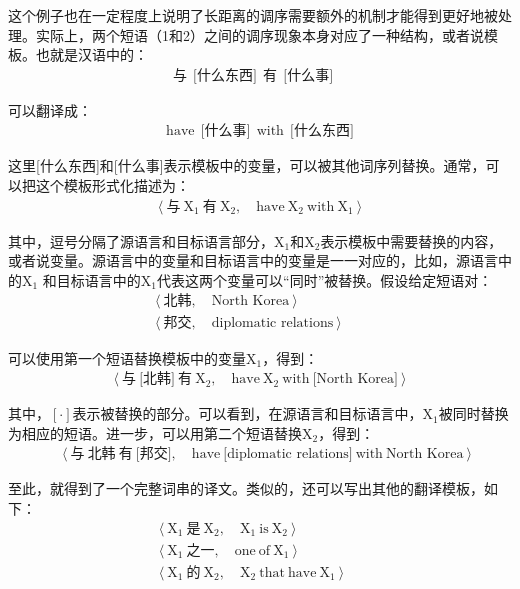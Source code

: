 \parinterval 这个例子也在一定程度上说明了长距离的调序需要额外的机制才能得到更好地被处理。实际上，两个短语（1和2）之间的调序现象本身对应了一种结构，或者说模板。也就是汉语中的：
\begin{eqnarray}
\text{与}\ \ \text{[什么东西]}\ \ \text{有}\ \ \text{[什么事]} \quad \nonumber
\end{eqnarray}

\parinterval 可以翻译成：
\begin{eqnarray}
\textrm{have}\ \ \text{[什么事]}\ \ \textrm{with}\ \ \text{[什么东西]} \nonumber
\end{eqnarray}

\parinterval 这里[什么东西]和[什么事]表示模板中的变量，可以被其他词序列替换。通常，可以把这个模板形式化描述为：
\begin{eqnarray}
\langle \ \text{与}\ \textrm{X}_1\ \text{有}\ \textrm{X}_2,\quad \textrm{have}\ \textrm{X}_2\ \textrm{with}\ \textrm{X}_1\ \rangle \nonumber
\end{eqnarray}

\noindent 其中，逗号分隔了源语言和目标语言部分，$\textrm{X}_1$和$\textrm{X}_2$表示模板中需要替换的内容，或者说变量。源语言中的变量和目标语言中的变量是一一对应的，比如，源语言中的$\textrm{X}_1$ 和目标语言中的$\textrm{X}_1$代表这两个变量可以``同时''被替换。假设给定短语对：
\begin{eqnarray}
\langle \ \text{北韩},\quad \textrm{North Korea} \ \rangle \qquad\ \quad\quad\ \  \nonumber \\
\langle \ \text{邦交},\quad \textrm{diplomatic relations} \ \rangle\quad\ \ \ \nonumber
\end{eqnarray}

\parinterval 可以使用第一个短语替换模板中的变量$\textrm{X}_1$，得到：
\begin{eqnarray}
\langle \ \text{与}\ \text{[北韩]}\ \text{有}\ \textrm{X}_2,\quad \textrm{have}\ \textrm{X}_2\ \textrm{with}\ \textrm{[North Korea]} \ \rangle \nonumber
\end{eqnarray}

\noindent 其中，$[\cdot]$表示被替换的部分。可以看到，在源语言和目标语言中，$\textrm{X}_1$被同时替换为相应的短语。进一步，可以用第二个短语替换$\textrm{X}_2$，得到：
\begin{eqnarray}
\quad\langle \ \text{与}\ \text{北韩}\ \text{有}\ \text{[邦交]},\quad \textrm{have}\ \textrm{[diplomatic relations]}\ \textrm{with}\ \textrm{North Korea} \ \rangle \nonumber
\end{eqnarray}

\parinterval 至此，就得到了一个完整词串的译文。类似的，还可以写出其他的翻译模板，如下：
\begin{eqnarray}
\langle \ \textrm{X}_1\ \text{是}\ \textrm{X}_2,\quad \textrm{X}_1\ \textrm{is}\ \textrm{X}_2 \ \rangle \qquad\qquad\ \nonumber \\
\langle \ \textrm{X}_1\ \text{之一},\quad \textrm{one}\ \textrm{of}\ \textrm{X}_1 \ \rangle \qquad\qquad\ \nonumber \\
\langle \ \textrm{X}_1\ \text{的}\ \textrm{X}_2,\quad \textrm{X}_2\ \textrm{that}\ \textrm{have}\ \textrm{X}_1\ \rangle\quad\ \nonumber
\end{eqnarray}

